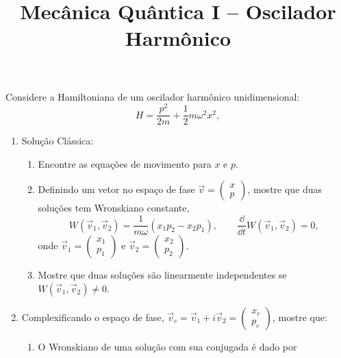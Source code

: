 \newif\ifuseseminar
\useseminartrue


\title{Mecânica Quântica I -- Oscilador Harmônico}



Considere a Hamiltoniana de um oscilador harmônico unidimensional:
\begin{equation*}
    H = \frac{p^2}{2m} + \frac{1}{2}m\omega^2x^2,
\end{equation*}
\begin{enumerate}
    \item Solução Clássica:
          \begin{enumerate}
              \item Encontre as equações de movimento para $x$ e $p$.
              \item Definindo um vetor no espaço de fase $\vec{v} = \begin{pmatrix} x \\ p
                        \end{pmatrix}$, mostre que duas soluções tem Wronskiano constante,
                    \begin{equation*}
                        W(\vec{v}_1, \vec{v}_2) = \frac{1}{m\omega}\left(x_1p_2 - x_2p_1\right),
                        \qquad \frac{\dd}{\dd t} W(\vec{v}_1, \vec{v}_2) = 0,
                    \end{equation*}
                    onde $\vec{v}_1 = \begin{pmatrix} x_1 \\ p_1 \end{pmatrix}$ e $\vec{v}_2 =
                        \begin{pmatrix} x_2 \\ p_2 \end{pmatrix}$.
              \item Mostre que duas soluções são linearmente independentes se $W(\vec{v}_1,
                        \vec{v}_2) \neq 0$.
          \end{enumerate}
    \item Complexificando o espaço de fase, $\vec{v}_c = \vec{v}_1 + i\vec{v}_2 =
              \begin{pmatrix} x_c \\ p_c \end{pmatrix}$, mostre que:
          \begin{enumerate}
              \item O Wronskiano de uma solução com sua conjugada é dado por

\end{enumerate}
\end{enumerate}
